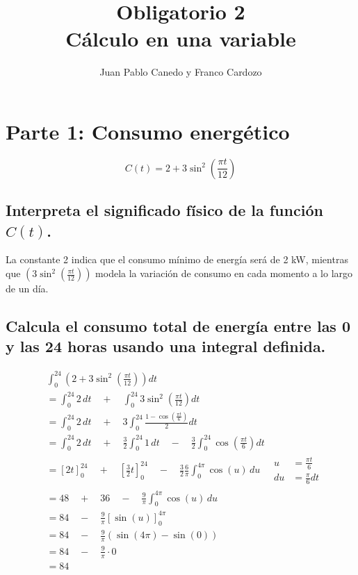 \documentclass[11pt, a4paper]{article}
\title{Obligatorio 2 \\ Cálculo en una variable}
\author{Juan Pablo Canedo y Franco Cardozo}
\date{}
\begin{document}
\maketitle
\clearpage

\section{Parte 1: Consumo energético}

$$C(t) = 2 + 3 \sin^2 \left(\frac{\pi t}{12}\right)$$


\subsection{Interpreta el significado físico de la función $C(t)$.}
La constante 2 indica que el consumo mínimo de energía será de 2 kW, mientras que $(3 \sin^2 \left(\frac{\pi t}{12}\right))$ modela la variación de consumo en cada momento a lo largo de un día.

\subsection{ Calcula el consumo total de energía entre las 0 y las 24 horas usando una integral definida.}

\begin{align*}
    & \int_{0}^{24} \left(2 + 3\sin^2\left(\frac{\pi t}{12}\right)\right) dt \\
    &= \int_{0}^{24} 2 \, dt \quad + \quad \int_{0}^{24} 3\sin^2\left(\frac{\pi t}{12}\right) dt \\
    &= \int_{0}^{24} 2 \, dt \quad + \quad 3\int_{0}^{24} \frac{1 - \cos\left(\frac{\pi t}{6}\right)}{2} dt \\
    &= \int_{0}^{24} 2 \, dt \quad + \quad \frac{3}{2}\int_{0}^{24} 1 \, dt \quad - \quad \frac{3}{2}\int_{0}^{24} \cos\left(\frac{\pi t}{6}\right) dt \\
    &= \left[2t\right]_{0}^{24} \quad + \quad \left[\frac{3}{2}t\right]_{0}^{24} \quad - \quad \frac{3}{2} \frac{6}{\pi} \int_{0}^{4\pi} \cos(u) \, du \quad
    \boxed{
        \begin{aligned}
            u &= \frac{\pi t}{6} \\
            du &= \frac{\pi}{6} dt
        \end{aligned}
    } \\
    &= 48 \quad + \quad 36 \quad - \quad \frac{9}{\pi} \int_{0}^{4\pi} \cos(u) \, du \\
    &= 84 \quad - \quad \frac{9}{\pi} \left[\sin(u)\right]_{0}^{4\pi} \\
    &= 84 \quad - \quad \frac{9}{\pi} (\sin(4\pi) - \sin(0)) \\
    &= 84 \quad - \quad \frac{9}{\pi} \cdot 0 \\
    &= \boxed{84}
\end{align*}
\end{document}
